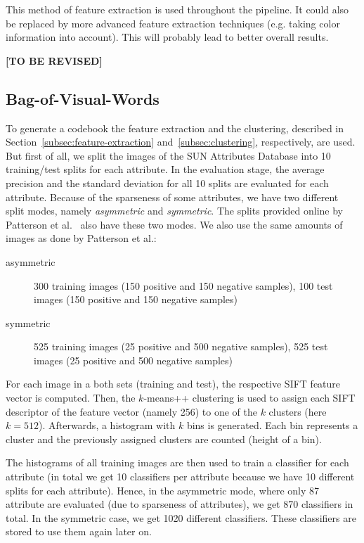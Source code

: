 \documentclass{vldb}
\newcommand{\tbr}{{\color{red}\textbf{[TO BE REVISED]}}}
\begin{document}
This method of feature extraction is used throughout the pipeline. It could also
be replaced by more advanced feature extraction techniques (e.g. taking color
information into account). This will probably lead to better overall results.

\tbr

\subsection{Bag-of-Visual-Words}
\label{subsec:bovw}

To generate a codebook the feature extraction and the clustering, described in
Section~\ref{subsec:feature-extraction} and~\ref{subsec:clustering}, respectively,
are used.
But first of all, we split the images of the SUN Attributes Database into 10
training/test splits for each attribute. In the evaluation stage, the average
precision and the standard deviation for all 10 splits are evaluated for each
attribute. Because of the sparseness of some attributes, we have two different
split modes, namely \emph{asymmetric} and \emph{symmetric}. The splits provided
online by Patterson et al.~\cite{Patterson:2012} also have these two modes.
We also use the same amounts of images as done by Patterson et al.:
\begin{description}
  \item[asymmetric] 300 training images (150 positive and 150 negative samples),
    100 test images (150 positive and 150 negative samples)
  \item[symmetric] 525 training images (25 positive and 500 negative samples),
    525 test images (25 positive and 500 negative samples)
\end{description}

For each image in a both sets (training and test), the respective SIFT feature
vector is computed. Then, the $k$-means++ clustering is used to assign each SIFT
descriptor of the feature vector (namely 256) to one of the $k$ clusters (here
$k=512$). Afterwards, a histogram with $k$ bins is generated. Each bin represents
a cluster and the previously assigned clusters are counted (height of a bin).

The histograms of all training images are then used to train a classifier for each
attribute (in total we get 10 classifiers per attribute because we have 10
different splits for each attribute). Hence, in the asymmetric mode, where only
87 attribute are evaluated (due to sparseness of attributes), we get 870
classifiers in total. In the symmetric case, we get 1020 different classifiers.
These classifiers are stored to use them again later on.
\end{document}
